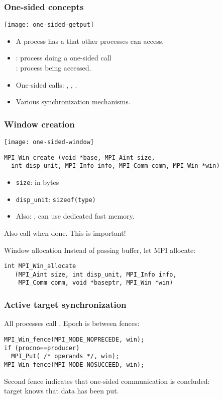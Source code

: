\begin{frame}[containsverbatim]\frametitle{One-sided concepts}
  \texttt{[image: one-sided-getput]}
  \begin{itemize}
  \item A process has a  that other processes can access.
  \item {}: process doing a one-sided call\\
    : process being accessed.
  \item One-sided calls: , , .
  \item Various synchronization mechanisms.
  \end{itemize}
\end{frame}

\begin{frame}[containsverbatim]\frametitle{Window creation}
  \texttt{[image: one-sided-window]}
\lstset{language=C}
\begin{lstlisting}
MPI_Win_create (void *base, MPI_Aint size, 
  int disp_unit, MPI_Info info, MPI_Comm comm, MPI_Win *win)
\end{lstlisting}
\begin{itemize}
\item \lstinline{size}: in bytes
\item \lstinline{disp_unit}: \lstinline{sizeof(type)}
\item Also: , can use dedicated fast memory.
\end{itemize}
Also call  when done. This is important!
\end{frame}

\begin{frame}[containsverbatim]{Window allocation}
  Instead of passing buffer, let MPI allocate:
\lstset{language=C}
\begin{lstlisting}
int MPI_Win_allocate
   (MPI_Aint size, int disp_unit, MPI_Info info,
    MPI_Comm comm, void *baseptr, MPI_Win *win)
\end{lstlisting}
\end{frame}

\begin{frame}[containsverbatim]\frametitle{Active target synchronization}
  All processes call . Epoch is between fences:
\lstset{language=C}
\begin{lstlisting}
MPI_Win_fence(MPI_MODE_NOPRECEDE, win);
if (procno==producer)
  MPI_Put( /* operands */, win);
MPI_Win_fence(MPI_MODE_NOSUCCEED, win);
\end{lstlisting}
Second fence indicates that one-sided communication is concluded:\\
target knows that data has been put.
\end{frame}

